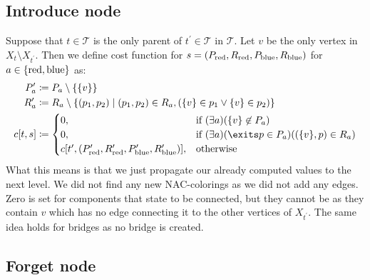 \subsection{Introduce node}

Suppose that \( t \in \mathcal{T} \) is
the only parent of \( t^\prime \in \mathcal{T} \) in \( \mathcal {T} \).
Let \( v \) be the only vertex in \( X_t \setminus X_{t^\prime} \).
Then we define cost function for \( s=(P_{\text{red}}, R_{\text{red}}, P_{\text{blue}}, R_{\text{blue}}) \)
for \( a \in \{\text{red}, \text{blue}\} \) as:
%
\begin{align*}
	P_a^\prime & \coloneqq P_a \setminus \{\{v\}\}                                                                    \notag \\
	R_a^\prime & \coloneqq R_a \setminus \{ (p_1, p_2) \mid (p_1, p_2) \in R_a, (\{v\} \in p_1 \lor \{v\} \in p_2) \} \notag \\
	c[t, s]    & \coloneqq
	\begin{cases}
		0,                                                                           & \text{if } (\exists a)(\{v\} \not\in P_a)                      \\
		0,                                                                           & \text{if } (\exists a )(\exits p \in P_a) ((\{v\}, p) \in R_a) \\
		c[t^\prime, (P_\red^\prime, R_\red^\prime, P_\blue^\prime, R_\blue^\prime)], & \text{otherwise}
	\end{cases}
\end{align*}
%
What this means is that we just propagate our already computed values to the next level.
We did not find any new NAC-colorings as we did not add any edges.
Zero is set for components that state to be connected,
but they cannot be as they contain \( v \)
which has no edge connecting it to the other vertices of \( X_{t^\prime} \).
The same idea holds for bridges as no bridge is created.

\subsection{Forget node}

